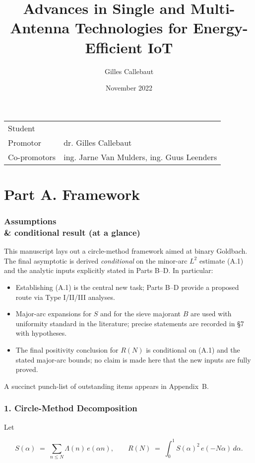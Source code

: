 \documentclass[11pt]{article}
\title{Advances in Single and Multi-Antenna Technologies for Energy-Efficient IoT
}
\author{Gilles Callebaut}
\date{November 2022}
\makeatletter
\theoremstyle{definition}
\theoremstyle{remark}
\providecommand{\theauthor}{\@author}
\makeatother
\begin{document}
\maketitle

\noindent\begin{tabular}{@{}ll}
    Student & \theauthor\\
     Promotor &  dr. Gilles Callebaut\\
     Co-promotors & ing. Jarne Van Mulders, ing. Guus Leenders
\end{tabular}

\part*{Part A. Framework}

\section*{Assumptions \\& conditional result (at a glance)}

This manuscript lays out a circle-method framework aimed at binary Goldbach. The final asymptotic is derived \emph{conditional} on the minor-arc $L^2$ estimate (A.1) and the analytic inputs explicitly stated in Parts B–D. In particular:

\begin{itemize}
  \item Establishing (A.1) is the central new task; Parts B–D provide a proposed route via Type I/II/III analyses.
  \item Major-arc expansions for $S$ and for the sieve majorant $B$ are used with uniformity standard in the literature; precise statements are recorded in §7 with hypotheses.
  \item The final positivity conclusion for $R(N)$ is conditional on (A.1) and the stated major-arc bounds; no claim is made here that the new inputs are fully proved.
\end{itemize}

A succinct punch-list of outstanding items appears in Appendix~B.

\section*{1. Circle-Method Decomposition}

Let

$$
S(\alpha)\;=\;\sum_{n\le N}\Lambda(n)\,e(\alpha n),\qquad
R(N)\;=\;\int_{0}^{1} S(\alpha)^2\,e(-N\alpha)\,d\alpha .
$$
\end{document}
